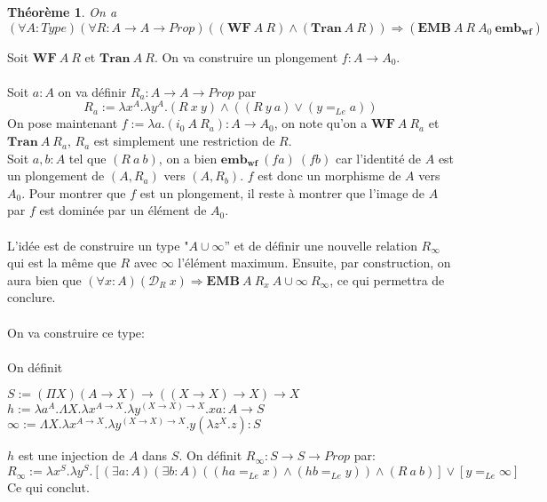 \documentclass[a4paper,12pt]{article}
\theoremstyle{plain}
\newtheorem{theo}{Théorème}[subsection]
\newenvironment{demo}[1][]
 {\if\relax\detokenize{#1}\relax
    \renewcommand\theproofinner{\thetheo}%
  \else
    \renewcommand{\theproofinner}{#1}%
  \fi
  \proofinner}
 {\endproofinner}
\begin{document}
\begin{theo}
\label{cle1}
On a $$(\forall A : \mathit{Type})( \forall R: A \to A \to \mathit{Prop}) ((\mathbf{WF}\ A \ R) \land (\mathbf{Tran} \ A \ R)) \Rightarrow(\mathbf{EMB}\ A \ R \ A_0 \ \mathbf{{emb}_{wf}})$$
\end{theo}

\begin{demo} Soit $\mathbf{WF}\ A \ R$ et $\mathbf{Tran} \ A \ R$. On va construire un plongement $f: A \to A_0$.\\
\\ 
Soit $a:A$ on va définir $R_a: A \to A \to \mathit{Prop}$ par
$$R_a := \lambda x^A. \lambda y^A. (R \ x \ y) \land ((R \ y \ a) \lor (y =_{\mathit{Le}}a)) $$
On pose maintenant $f := \lambda a. (i_0 \ A \ R_a) : A \to A_0$, on note qu'on a $\mathbf{WF}\ A \ R_a$ et $\mathbf{Tran} \ A \ R_a$, $R_a$ est simplement une restriction de $R$.\\ 
Soit $a,b :A$ tel que $(R \ a \ b)$, on a bien $\mathbf{{emb}_{wf}}\ (fa)\ (fb)$ car l'identité de $A$ est un plongement de $(A, R_a)$ vers $(A, R_b)$. $f$ est donc un morphisme de $A$ vers $A_0$. Pour montrer que $f$ est un plongement, il reste à montrer que l'image de $A$ par $f$ est dominée par un élément de $A_0$.\\
\\
L'idée est de construire un type "$A \cup {\infty}$'' et de définir une nouvelle relation $R_\infty$ qui est la même que $R$ avec $\infty$ l'élément maximum. Ensuite, par construction, on aura bien que $(\forall x:A) (\mathcal{D}_R \ x) \Rightarrow\mathbf{EMB}\ A \ R_x \ A \cup {\infty} \ R_\infty$, ce qui permettra de conclure.\\
\\ 
On va construire ce type:\\
\\
On définit
\begin{center}
$ S := (\Pi X)(A \to X) \to ( (X \to X) \to X) \to X$\\[3mm]
$ h := \lambda a^A. \Lambda X. \lambda x^{A \to X}. \lambda y^{(X \to X) \to X}. xa : A \to S$\\[3mm]
$\infty := \Lambda X. \lambda x^{A \to X}. \lambda y^{(X \to X) \to X}. y (\lambda z^X.z) : S$
\end{center}
\vspace{4mm}
$h$ est une injection de $A$ dans $S$. On définit $R_\infty : S \to S \to \mathit{Prop}$ par:
$$R_\infty := \lambda x^S. \lambda y^S. [(\exists a : A)(\exists b : A) ((ha =_{\mathit{Le}}x) \land (hb =_{\mathit{Le}}y)) \land (R \ a \ b)] \lor [ y =_{\mathit{Le}}\infty]$$
Ce qui conclut. 
\end{demo}
\end{document}
